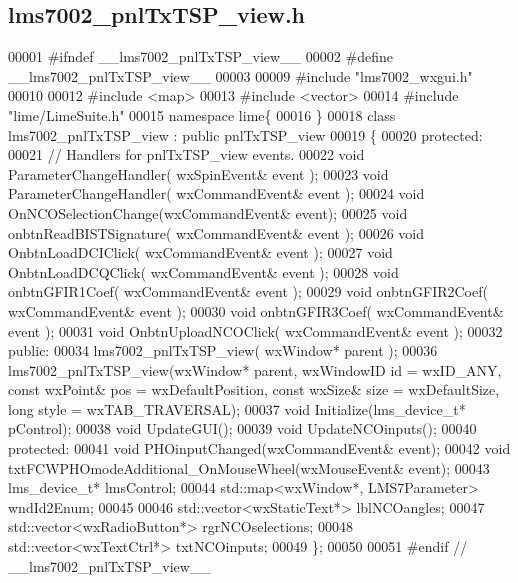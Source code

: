 \subsection{lms7002\+\_\+pnl\+Tx\+T\+S\+P\+\_\+view.\+h}
\label{lms7002__pnlTxTSP__view_8h_source}

\begin{DoxyCode}
00001 \textcolor{preprocessor}{#ifndef \_\_lms7002\_pnlTxTSP\_view\_\_}
00002 \textcolor{preprocessor}{#define \_\_lms7002\_pnlTxTSP\_view\_\_}
00003 
00009 \textcolor{preprocessor}{#include "lms7002_wxgui.h"}
00010 
00012 \textcolor{preprocessor}{#include <map>}
00013 \textcolor{preprocessor}{#include <vector>}
00014 \textcolor{preprocessor}{#include "lime/LimeSuite.h"}
00015 \textcolor{keyword}{namespace }lime\{
00016 \}
00018 \textcolor{keyword}{class }lms7002_pnlTxTSP_view : \textcolor{keyword}{public} pnlTxTSP_view
00019 \{
00020 \textcolor{keyword}{protected}:
00021     \textcolor{comment}{// Handlers for pnlTxTSP\_view events.}
00022     \textcolor{keywordtype}{void} ParameterChangeHandler( wxSpinEvent& event );
00023     \textcolor{keywordtype}{void} ParameterChangeHandler( wxCommandEvent& event );
00024     \textcolor{keywordtype}{void} OnNCOSelectionChange(wxCommandEvent& event);
00025     \textcolor{keywordtype}{void} onbtnReadBISTSignature( wxCommandEvent& event );
00026     \textcolor{keywordtype}{void} OnbtnLoadDCIClick( wxCommandEvent& event );
00027     \textcolor{keywordtype}{void} OnbtnLoadDCQClick( wxCommandEvent& event );
00028     \textcolor{keywordtype}{void} onbtnGFIR1Coef( wxCommandEvent& event );
00029     \textcolor{keywordtype}{void} onbtnGFIR2Coef( wxCommandEvent& event );
00030     \textcolor{keywordtype}{void} onbtnGFIR3Coef( wxCommandEvent& event );
00031     \textcolor{keywordtype}{void} OnbtnUploadNCOClick( wxCommandEvent& event );
00032 \textcolor{keyword}{public}:
00034     lms7002_pnlTxTSP_view( wxWindow* parent );
00036     lms7002_pnlTxTSP_view(wxWindow* parent, wxWindowID \textcolor{keywordtype}{id} = wxID\_ANY, \textcolor{keyword}{const} wxPoint& pos = 
      wxDefaultPosition, \textcolor{keyword}{const} wxSize& size = wxDefaultSize, \textcolor{keywordtype}{long} style = wxTAB\_TRAVERSAL);
00037     \textcolor{keywordtype}{void} Initialize(lms_device_t* pControl);
00038     \textcolor{keywordtype}{void} UpdateGUI();
00039     \textcolor{keywordtype}{void} UpdateNCOinputs();
00040 \textcolor{keyword}{protected}:
00041     \textcolor{keywordtype}{void} PHOinputChanged(wxCommandEvent& event);
00042     \textcolor{keywordtype}{void} txtFCWPHOmodeAdditional\_OnMouseWheel(wxMouseEvent& event);
00043     lms_device_t* lmsControl;
00044     std::map<wxWindow*, LMS7Parameter> wndId2Enum;
00045 
00046     std::vector<wxStaticText*> lblNCOangles;
00047     std::vector<wxRadioButton*> rgrNCOselections;
00048     std::vector<wxTextCtrl*> txtNCOinputs;
00049 \};
00050 
00051 \textcolor{preprocessor}{#endif // \_\_lms7002\_pnlTxTSP\_view\_\_}
\end{DoxyCode}
